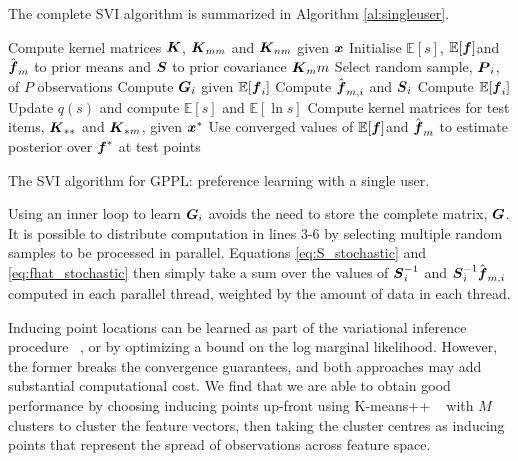 The complete SVI algorithm is summarized in Algorithm \ref{al:singleuser}.
\begin{algorithm}[h]
 \nl Compute kernel matrices $\boldsymbol K$, $\boldsymbol K_{mm}$ and $\boldsymbol K_{nm}$ given $\boldsymbol x$
 \nl Initialise $\mathbb{E}[s]$, $\mathbb{E}[\boldsymbol f]$and $\hat{\boldsymbol f}_m$ to prior means
 and $\boldsymbol S$ to prior covariance $\boldsymbol K_mm$\;
 {
 \nl Select random sample, $\boldsymbol P_i$, of $P$ observations
  {
  \nl Compute $\boldsymbol G_i$ given $\mathbb{E}[\boldsymbol f_i]$ \;
  \nl Compute $\hat{\boldsymbol f}_{m,i}$ and $\boldsymbol S_{i}$ \;
  \nl Compute $\mathbb{E}[\boldsymbol f_i]$ \;
  }
 \nl Update $q(s)$ and compute $\mathbb{E}[s]$ and $\mathbb{E}[\ln s]$\;
 }
\nl Compute kernel matrices for test items, $\boldsymbol K_{**}$ and $\boldsymbol K_{*m}$, given $\boldsymbol x^*$ \;
\nl Use converged values of $\mathbb{E}[\boldsymbol f]$and $\hat{\boldsymbol f}_m$ to estimate
posterior over $\boldsymbol f^*$ at test points \;
\vspace{0.5cm}
\caption{The SVI algorithm for GPPL: preference learning with a single user.}
\label{al:singleuser}
\end{algorithm}
Using an inner loop to learn $\boldsymbol G_i$ avoids the need to store the complete matrix, 
$\boldsymbol G$.
It is possible to distribute computation in lines 3-6 by selecting multiple random samples
to be processed in parallel. Equations \ref{eq:S_stochastic} and \ref{eq:fhat_stochastic}
then simply take a sum over the values of $\boldsymbol S^{-1}_i$ and $\boldsymbol S^{-1}_i\hat{\boldsymbol f}_{m,i}$
computed in each parallel thread, weighted by the amount of data in each thread.

Inducing point locations can be learned
as part of the variational inference procedure ~\citep{hensman2015scalable},
or by optimizing a bound on the log marginal likelihood.
However, the former breaks the convergence guarantees, and both approaches
may add substantial computational cost. 
We find that we are able to obtain good performance by choosing inducing points up-front using K-means++ ~\citep{arthur2007k} with $M$ clusters to  
cluster the feature vectors, 
then taking the cluster centres as inducing points that represent the spread of observations across feature space.


